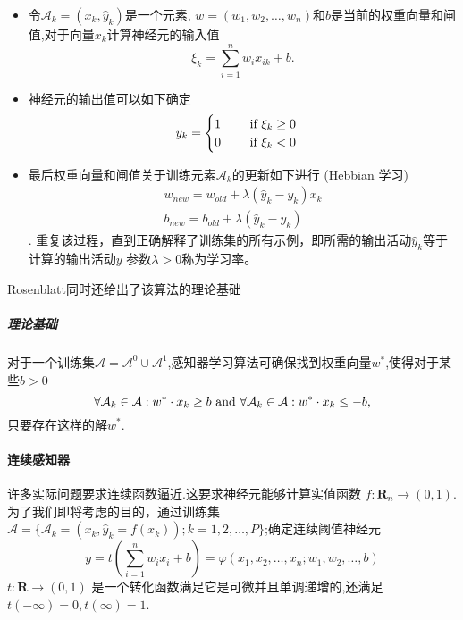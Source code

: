 \begin{itemize}
\item 令$\mathcal{A}_k = (x_k,\hat{y}_k)$是一个元素, $w = (w_1,w_2,\ldots,w_n)$和$b$是当前的权重向量和闸值,对于向量$x_k$计算神经元的输入值
  \[\xi_k = \sum_{i=1}^n w_i x_{ik} + b.\]

\item 神经元的输出值可以如下确定
  \begin{align*}
    y_k =
    \begin{cases}
      1 \qquad \textmd{ if } \xi_k \geq 0 \\
      0 \qquad \textmd{ if } \xi_k <0
    \end{cases}
  \end{align*}

\item 最后权重向量和闸值关于训练元素$\mathcal{A}_k$的更新如下进行 (Hebbian 学习)
  \begin{align*}
    w_{new} = w_{old} + \lambda (\hat{y}_k - y_k)x_k \\
    b_{new} = b_{old} + \lambda (\hat{y}_k - y_k)
  \end{align*}.
  重复该过程，直到正确解释了训练集的所有示例，即所需的输出活动$\hat{y}_k$等于计算的输出活动$y$ 参数$\lambda > 0$称为学习率。
\end{itemize}

Rosenblatt同时还给出了该算法的理论基础

\subparagraph{理论基础}


\begin{thm}
  对于一个训练集$\mathcal{A} = \mathcal{A}^0 \cup \mathcal{A}^1$,感知器学习算法可确保找到权重向量$w^*$,使得对于某些$b >0$
  \[\forall \mathcal{A}_k \in \mathcal{A} : w^* \cdot x_k \geq b \textmd{ and } \forall \mathcal{A}_k \in \mathcal{A} : w^* \cdot x_k \leq -b,\]
  只要存在这样的解$w^*$.
\end{thm}

\paragraph{连续感知器}

许多实际问题要求连续函数逼近.这要求神经元能够计算实值函数 $f \colon \mathbf{R}_n \rightarrow (0,1)$.为了我们即将考虑的目的，通过训练集$\mathcal{A} = \{\mathcal{A}_k = (x_k, \hat{y}_k = f(x_k)); k=1,2,\ldots,P\}$;确定连续阈值神经元
\[ y = t\left( \sum_{i=1}^n  w_i x_i  + b\right) = \varphi(x_1,x_2,\ldots,x_n;w_1,w_2,\ldots, b)\]
$t \colon \mathbf{R} \rightarrow (0,1)$ 是一个转化函数满足它是可微并且单调递增的,还满足$t(-\infty) = 0, t(\infty) = 1$.

